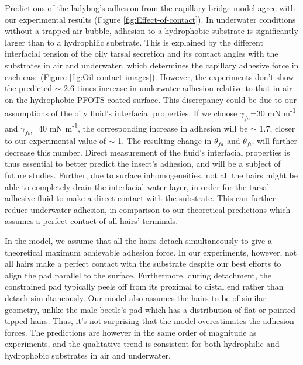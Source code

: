 \documentclass[vruler,JEB]{COB}%
\begin{document}
Predictions of the ladybug's adhesion from the capillary bridge model
agree with our experimental results (Figure \ref{fig:Effect-of-contact}).
In underwater conditions without a trapped air bubble, adhesion to a hydrophobic
substrate is significantly larger than to a hydrophilic substrate.
This is explained by the different interfacial tension of the oily tarsal secretion and its contact
angles with the substrates in air and underwater, which determines
the capillary adhesive force in each case (Figure \ref{fig:Oil-contact-images}).
However, the experiments don't show the predicted $\sim$ 2.6 times
increase in underwater adhesion relative to that in air on the hydrophobic
PFOTS-coated surface. This discrepancy could be due to our assumptions of
the oily fluid's interfacial properties. If we choose $\gamma_{fa}$=30
mN m\protect\textsuperscript{-1} and $\gamma_{fw}$=40 mN m\protect\textsuperscript{-1}, the corresponding increase in adhesion
will be $\sim$ 1.7, closer to our experimental value of $\sim$ 1.
The resulting change in $\theta_{fa}$ and $\theta_{fw}$ will further
decrease this number. Direct measurement of the fluid's interfacial
properties is thus essential to better predict the insect's adhesion,
and will be a subject of future studies. Further, due to surface inhomogeneities,
not all the hairs might be able to completely drain the interfacial
water layer, in order for the tarsal adhesive fluid to make a direct contact
with the substrate. This can further reduce underwater adhesion, in
comparison to our theoretical predictions which assumes a perfect
contact of all hairs' terminals.

In the model, we assume that all the hairs detach simultaneously to
give a theoretical maximum achievable adhesion force. In our experiments,
however, not all hairs make a perfect contact with the substrate despite our 
best efforts to align the pad parallel to the surface. Furthermore, during detachment, 
the constrained pad typically peels off from its proximal to distal end rather
than detach simultaneously. Our model also assumes the hairs to be
of similar geometry, unlike the male beetle's pad which has a distribution
of flat or pointed tipped hairs. Thus, it's not surprising that the
model overestimates the adhesion forces. The predictions are however
in the same order of magnitude as experiments, and the qualitative
trend is consistent for both hydrophilic and hydrophobic substrates
in air and underwater.
\end{document}
